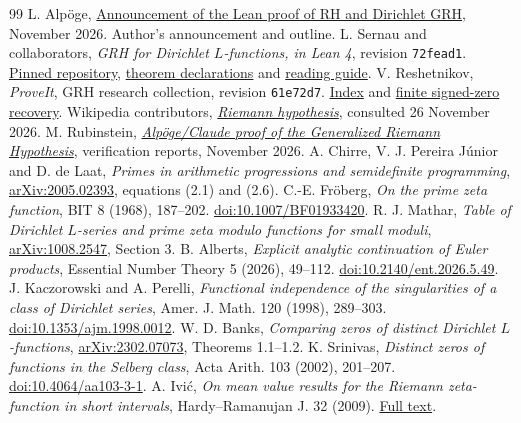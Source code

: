 \documentclass[11pt,letterpaper]{article}
\begin{document}
\clearpage
\begin{thebibliography}{99}\small
{} L. Alp\"oge, \href{https://alpo.ge/remark.pdf}{Announcement of the Lean proof of RH and Dirichlet GRH}, November 2026. Author's announcement and outline.
 L. Sernau and collaborators, \emph{GRH for Dirichlet $L$-functions, in Lean 4}, revision \texttt{72fead1}. \href{https://github.com/lsernau/grh-lean/tree/72fead102f663d5c7a407964a13dc0cf9d977207}{Pinned repository}, \href{https://github.com/lsernau/grh-lean/blob/72fead102f663d5c7a407964a13dc0cf9d977207/grh/src/Main.lean}{theorem declarations} and \href{https://github.com/lsernau/grh-lean/blob/72fead102f663d5c7a407964a13dc0cf9d977207/grh/GUIDE.md}{reading guide}.
 V. Reshetnikov, \emph{ProveIt}, GRH research collection, revision \texttt{61e72d7}. \href{https://github.com/VladimirReshetnikov/ProveIt/tree/61e72d75affa1084cf3ac4f66d199f54efde05fe/Analysis/GeneralizedRiemannHypothesis}{Index} and \href{https://github.com/VladimirReshetnikov/ProveIt/blob/61e72d75affa1084cf3ac4f66d199f54efde05fe/Analysis/GeneralizedRiemannHypothesis/Research/grh-torsion-and-zero-data/recovery.tex}{finite signed-zero recovery}.
 Wikipedia contributors, \href{https://en.wikipedia.org/wiki/Riemann_hypothesis}{\emph{Riemann hypothesis}}, consulted 26 November 2026.
 M. Rubinstein, \href{https://www.math.uwaterloo.ca/~mrubinst/alpoge_claude_grh/}{\emph{Alp\"oge/Claude proof of the Generalized Riemann Hypothesis}}, verification reports, November 2026.
 A. Chirre, V. J. Pereira J\'unior and D. de Laat, \emph{Primes in arithmetic progressions and semidefinite programming}, \href{https://arxiv.org/abs/2005.02393}{arXiv:2005.02393}, equations (2.1) and (2.6).
 C.-E. Fr\"oberg, \emph{On the prime zeta function}, BIT 8 (1968), 187--202. \href{https://doi.org/10.1007/BF01933420}{doi:10.1007/BF01933420}.
 R. J. Mathar, \emph{Table of Dirichlet $L$-series and prime zeta modulo functions for small moduli}, \href{https://arxiv.org/abs/1008.2547}{arXiv:1008.2547}, Section 3.
 B. Alberts, \emph{Explicit analytic continuation of Euler products}, Essential Number Theory 5 (2026), 49--112. \href{https://doi.org/10.2140/ent.2026.5.49}{doi:10.2140/ent.2026.5.49}.
 J. Kaczorowski and A. Perelli, \emph{Functional independence of the singularities of a class of Dirichlet series}, Amer. J. Math. 120 (1998), 289--303. \href{https://doi.org/10.1353/ajm.1998.0012}{doi:10.1353/ajm.1998.0012}.
 W. D. Banks, \emph{Comparing zeros of distinct Dirichlet $L$-functions}, \href{https://arxiv.org/abs/2302.07073}{arXiv:2302.07073}, Theorems 1.1--1.2.
 K. Srinivas, \emph{Distinct zeros of functions in the Selberg class}, Acta Arith. 103 (2002), 201--207. \href{https://doi.org/10.4064/aa103-3-1}{doi:10.4064/aa103-3-1}.
 A. Ivi\'c, \emph{On mean value results for the Riemann zeta-function in short intervals}, Hardy--Ramanujan J. 32 (2009). \href{https://hrj.episciences.org/164/pdf}{Full text}.
\end{thebibliography}
\end{document}
